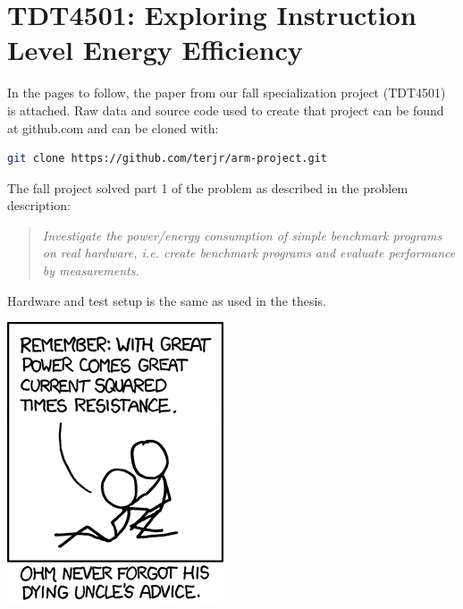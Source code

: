 \documentclass{MScthesisITEM}
\begin{document}
\chapter{TDT4501: Exploring Instruction Level Energy Efficiency}
\label{RH13}
In the pages to follow, the paper from our fall specialization project (TDT4501)
is attached. Raw data and source code used to create that project can be found at github.com
and can be cloned with:
\begin{lstlisting}[language=bash,numbers=none]
git clone https://github.com/terjr/arm-project.git
\end{lstlisting}

\noindent The fall project solved part 1 of the problem as described in the problem description:\hfill\\
\begin{quote}
    \emph{Investigate the power/energy
consumption of simple benchmark programs on real hardware, i.e. create benchmark
programs and evaluate performance by measurements.}
\end{quote}

Hardware and test setup is the same as used in the thesis.

\vfill
\newpage

\thispagestyle{empty}
\hfill
\vfill

\newpage



\newpage
\thispagestyle{empty}
\vfill
\newpage
\thispagestyle{empty}
\centering
\includegraphics{figs/ohm.png}
\vfill
\end{document}
